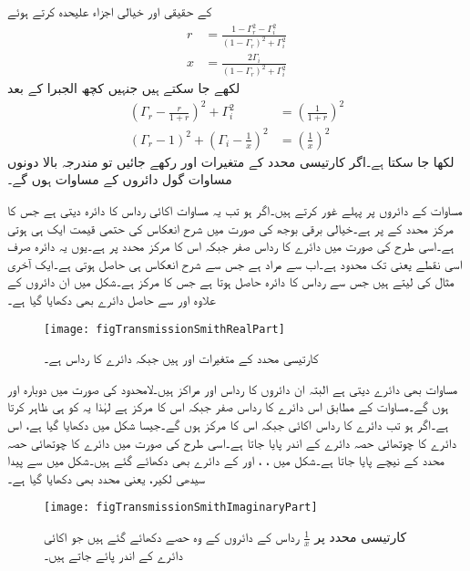 کے حقیقی اور خیالی اجزاء علیحدہ کرتے ہوئے
\begin{align}
r&=\frac{1-\Gamma_r^2-\Gamma_i^2}{\left(1-\Gamma_r\right)^2+\Gamma_i^2}\\
x&=\frac{2\Gamma_i}{\left(1-\Gamma_r\right)^2+\Gamma_i^2}
\end{align}
لکھے جا سکتے ہیں جنہیں کچھ الجبرا کے بعد
\begin{align}
\left(\Gamma_r-\frac{r}{1+r}\right)^2+\Gamma_i^2&=\left(\frac{1}{1+r}\right)^2 \label{مساوات_ترسیلی_سمتھ_دائرہ_الف}\\
\left(\Gamma_r-1 \right)^2+\left(\Gamma_i-\frac{1}{x} \right)^2&=\left(\frac{1}{x}\right)^2  \label{مساوات_ترسیلی_سمتھ_دائرہ_ب}
\end{align}
لکھا جا سکتا ہے۔اگر کارتیسی محدد کے متغیرات  اور  رکھے جائیں تو مندرجہ بالا دونوں مساوات گول دائروں کے مساوات ہوں گے۔

مساوات  کے دائروں پر پہلے غور کرتے ہیں۔اگر  ہو تب یہ مساوات اکائی رداس کا دائرہ دیتی ہے جس کا مرکز محدد کے  پر ہے۔خیالی برقی بوجھ کی صورت میں شرح انعکاس کی حتمی قیمت ایک ہی ہوتی ہے۔اسی طرح  کی صورت میں دائرے کا رداس صفر جبکہ اس کا مرکز محدد پر  ہے۔یوں یہ دائرہ صرف اسی نقطے یعنی  تک محدود ہے۔اب  سے مراد  ہے جس سے شرح انعکاس  ہی حاصل ہوتی ہے۔ایک آخری مثال  کی لیتے ہیں جس سے  رداس کا دائرہ حاصل ہوتا ہے جس کا مرکز  ہے۔شکل  میں ان دائروں کے علاوہ  اور  سے حاصل دائرے بھی  دکھایا گیا ہے۔ 

\begin{figure}
\centering
\texttt{[image: figTransmissionSmithRealPart]}
\caption{کارتیسی محدد کے متغیرات  اور  ہیں جبکہ دائرے کا رداس  ہے۔}
\label{شکل_ترسیلی_سمتھ-نقشہ_الف}
\end{figure}

مساوات  بھی دائرے دیتی ہے البتہ ان دائروں کا رداس  اور مراکز  ہیں۔لامحدود  کی صورت میں دوبارہ  اور  ہوں گے۔مساوات  کے مطابق اس دائرے کا رداس صفر جبکہ اس کا مرکز  ہے لہٰذا یہ  کو ہی ظاہر کرتا ہے۔اگر  ہو تب دائرے کا رداس اکائی جبکہ اس کا مرکز  ہوں گے۔جیسا شکل  میں دکھایا گیا ہے، اس دائرے کا چوتھائی حصہ  دائرے کے اندر پایا جاتا ہے۔اسی طرح  کی صورت میں دائرے کا چوتھائی حصہ   محدد کے نیچے پایا جاتا ہے۔شکل میں ، ،  اور  کے دائرے بھی دکھائے گئے ہیں۔شکل میں  سے پیدا سیدھی لکیر، یعنی  محدد بھی دکھایا گیا ہے۔
\begin{figure}
\centering
\texttt{[image: figTransmissionSmithImaginaryPart]}
\caption{کارتیسی محدد پر $\tfrac{1}{x}$ رداس کے دائروں کے وہ حصے دکھائے گئے ہیں جو اکائی دائرے کے اندر پائے جاتے ہیں۔}
\label{شکل_ترسیلی_سمتھ-نقشہ_ب}
\end{figure}

